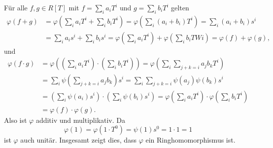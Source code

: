 \documentclass[a4paper, 10pt, numbers=noenddot]{scrartcl}
\begin{document}
Für alle $f, g \in R[T]$ mit $f = \sum_i a_i T^i$ und $g = \sum_i b_i T^i$ gelten
\begin{align*}
      \varphi(f + g)
  &=  \varphi\left( \sum_i a_i T^i + \sum_i b_i T^i \right)
   =  \varphi\left( \sum_i (a_i + b_i) T^i \right)
   =  \sum_i (a_i + b_i) s^i
  \\
  &=  \sum_i a_i s^i + \sum_i b_i s^i
   =  \varphi\left( \sum_i a_i T^i \right) + \varphi\left( \sum_i b_i TWi \right)
   =  \varphi(f) + \varphi(g),
\end{align*}
und
\begin{align*}
    \varphi(f \cdot g)
  &= \varphi\left( \left( \sum_i a_i T^i \right) \cdot \left( \sum_i b_i T^i \right) \right)
   = \varphi\left( \sum_i \sum_{j + k = i} a_j b_k T^i \right)
  \\
  &= \sum_i \psi\left( \sum_{j + k = i} a_j b_k \right) s^i
   = \sum_i \sum_{j + k = i} \psi(a_j) \psi(b_k) s^i
  \\
  &= \left( \sum_i \psi(a_i) s^i \right) \cdot \left( \sum_i \psi(b_i) s^i \right)
   = \varphi\left( \sum_i a_i T^i \right) \cdot \varphi\left( \sum_i b_i T^i \right)
  \\
  &= \varphi(f) \cdot \varphi(g).
\end{align*}
Also ist $\varphi$ additiv und multiplikativ.
Da
\[
    \varphi(1)
  = \varphi(1 \cdot T^0)
  = \psi(1) s^0
  = 1 \cdot 1
  = 1
\]
ist $\varphi$ auch unitär.
Insgesamt zeigt dies, dass $\varphi$ ein Ringhomomorphismus ist.
\end{document}
